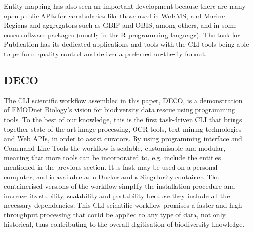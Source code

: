 Entity mapping has also seen an important development because there are many
open public APIs for vocabularies like those used in WoRMS, and Marine Regions
and aggregators such as GBIF and OBIS, among others, and in some cases software
packages (mostly in the R programming language). The task for Publication has
its dedicated applications and tools with the CLI tools being able to perform
quality control and deliver a preferred on-the-fly format.

   \subsection{DECO}
   The CLI scientific workflow assembled in this paper, DECO, is a demonstration
of EMODnet Biology’s vision for biodiversity data rescue using programming
tools. To the best of our knowledge, this is the first task-driven CLI that
brings together state-of-the-art image processing, OCR tools, text mining
technologies and Web APIs, in order to assist curators. By using programming
interface and Command Line Tools the workflow is scalable, customisable and
modular, meaning that more tools can be incorporated to, e.g. include the
entities mentioned in the previous section. It is fast, may be used on a
personal computer, and is available as a Docker and a Singularity container.
The containerised versions of the workflow simplify the installation procedure
and increase its stability, scalability and portability because they include
all the necessary dependencies. This CLI scientific workflow promises a faster
and high throughput processing that could be applied to any type of data, not
only historical, thus contributing to the overall digitisation of biodiversity
knowledge.

